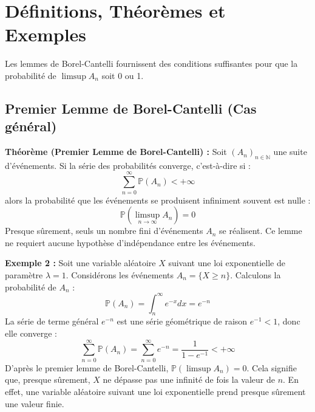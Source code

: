 \documentclass[11pt,a4paper]{article}
\begin{document}


\section{Définitions, Théorèmes et Exemples}

Les lemmes de Borel-Cantelli fournissent des conditions suffisantes pour que la probabilité de $\limsup A_n$ soit 0 ou 1.

\subsection{Premier Lemme de Borel-Cantelli (Cas général)}

\textbf{Théorème (Premier Lemme de Borel-Cantelli) :}
Soit $(A_n)_{n \in \mathbb{N}}$ une suite d'événements. Si la série des probabilités converge, c'est-à-dire si :
$$ \sum_{n=0}^\infty \mathbb{P}(A_n) < +\infty $$
alors la probabilité que les événements se produisent infiniment souvent est nulle :
$$ \mathbb{P}\left(\limsup_{n \to \infty} A_n\right) = 0 $$
Presque sûrement, seuls un nombre fini d'événements $A_n$ se réalisent. Ce lemme ne requiert aucune hypothèse d'indépendance entre les événements.

\textbf{Exemple 2 :}
Soit une variable aléatoire $X$ suivant une loi exponentielle de paramètre $\lambda = 1$. Considérons les événements $A_n = \{X \ge n\}$.
Calculons la probabilité de $A_n$ :
$$ \mathbb{P}(A_n) = \int_n^\infty e^{-x} dx = e^{-n} $$
La série de terme général $e^{-n}$ est une série géométrique de raison $e^{-1} < 1$, donc elle converge :
$$ \sum_{n=0}^\infty \mathbb{P}(A_n) = \sum_{n=0}^\infty e^{-n} = \frac{1}{1 - e^{-1}} < +\infty $$
D'après le premier lemme de Borel-Cantelli, $\mathbb{P}(\limsup A_n) = 0$.
Cela signifie que, presque sûrement, $X$ ne dépasse pas une infinité de fois la valeur de $n$. En effet, une variable aléatoire suivant une loi exponentielle prend presque sûrement une valeur finie.
\end{document}
